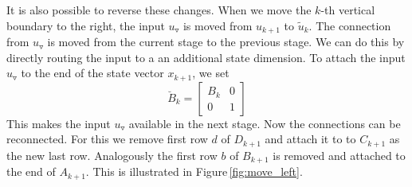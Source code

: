 \documentclass[doctype=mastersthesis,BCOR=15mm,biblatex]{ldvbook}%
\newcommand{\m}{\triangledown} %
\begin{document}
It is also possible to reverse these changes.
When we move the $k$-th vertical boundary to the right, the input $u_\m$ is moved from $u_{k+1}$ to $\tilde{u}_k$.
The connection from $u_\m$ is moved from the current stage to the previous stage.
We can do this by directly routing the input to a an additional state dimension.
To attach the input $u_\m$ to the end of the state vector $x_{k+1}$, we set 
\begin{equation}
	\breve{B}_k = \begin{bmatrix}
	B_k & 0\\
	0 & 1
	\end{bmatrix}
\end{equation}
This makes the input $u_\m$ available in the next stage.
Now the connections can be reconnected.
For this we remove first row $d$ of $D_{k+1}$ and attach it to to $C_{k+1}$ as the new last row. 
Analogously the first row $b$ of $B_{k+1}$ is removed and attached to the end of $A_{k+1}$.
This is illustrated in Figure\,\ref{fig:move_left}.
\end{document}
